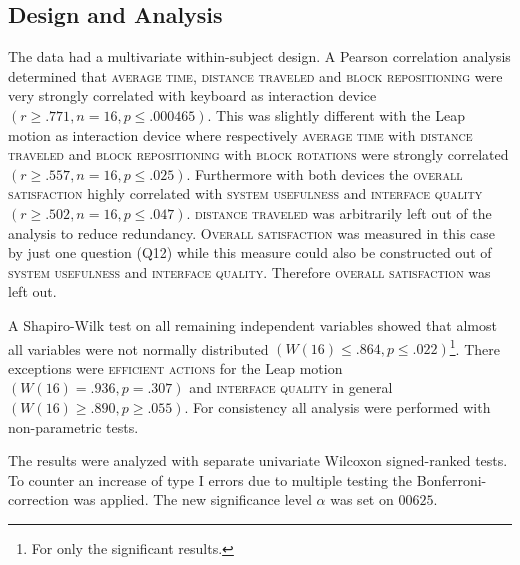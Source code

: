 \subsection{Design and Analysis}
The data had a multivariate within-subject design. A Pearson correlation analysis determined that \textsc{average time}, \textsc{distance traveled} and \textsc{block repositioning} 
were very strongly correlated with keyboard as interaction device $(r \geq .771, n = 16, p \leq .000465)$. This was slightly different with the Leap motion as interaction device
 where respectively \textsc{average time} with \textsc{distance traveled} and \textsc{block repositioning} with \textsc{block rotations} were strongly correlated $(r  \geq .557, n = 16,
 p \leq .025)$. Furthermore with both devices the \textsc{overall satisfaction} highly correlated with \textsc{system usefulness} and \textsc{interface quality}$(r  \geq .502, n = 16,
 p \leq .047)$. \textsc{distance traveled} was arbitrarily left out of the analysis to reduce redundancy. \textsc{Overall satisfaction} was measured in this case by just one question 
 (Q12) while this measure could also be constructed out of \textsc{system usefulness} and \textsc{interface quality}. Therefore \textsc{overall satisfaction} was left out.

A Shapiro-Wilk test on all remaining independent variables showed that almost all variables were not normally distributed $(W(16) \leq .864, p \leq .022 )$\footnote{For only the 
significant results.}. There exceptions were \textsc{efficient actions} for the Leap motion $(W(16) = .936, p = .307)$ and \textsc{interface quality} in general $(W(16) \geq .890, 
p \geq .055)$. For consistency all analysis were performed with non-parametric tests.

The results were analyzed with separate univariate Wilcoxon signed-ranked tests. To counter an increase of type I errors due to multiple testing the Bonferroni-correction 
was applied\cite{dunn61}. The new significance level $\alpha$ was set on $00625$.

